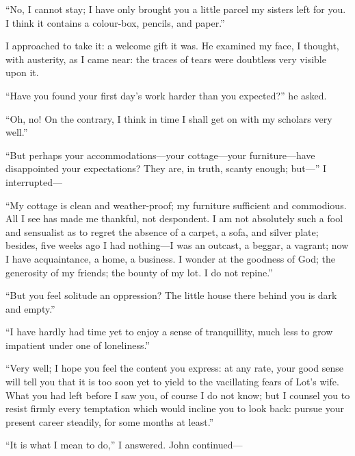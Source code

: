 \enquote{No, I cannot stay; I have only brought you a little parcel my
	sisters left for you. I think it contains a colour-box, pencils, and
	paper.}

I approached to take it: a welcome gift it was. He examined my face, I
thought, with austerity, as I came near: the traces of tears were
doubtless very visible upon it.

\enquote{Have you found your first day's work harder than you expected?}
he asked.

\enquote{Oh, no! On the contrary, I think in time I shall get on with
	my scholars very well.}

\enquote{But perhaps your accommodations---your cottage---your
	furniture---have disappointed your expectations? They are, in truth,
	scanty enough; but---} I interrupted---

\enquote{My cottage is clean and weather-proof; my furniture sufficient
	and commodious. All I see has made me thankful, not despondent. I am
	not absolutely such a fool and sensualist as to regret the absence of a
	carpet, a sofa, and silver plate; besides, five weeks ago I had
	nothing---I was an outcast, a beggar, a vagrant; now I have
	acquaintance, a home, a business. I wonder at the goodness of God; the
	generosity of my friends; the bounty of my lot. I do not repine.}

\enquote{But you feel solitude an oppression? The little house there
	behind you is dark and empty.}

\enquote{I have hardly had time yet to enjoy a sense of tranquillity,
	much less to grow impatient under one of loneliness.}

\enquote{Very well; I hope you feel the content you express: at any
	rate, your good sense will tell you that it is too soon yet to yield to
	the vacillating fears of Lot's wife. What you had left before I saw
	you, of course I do not know; but I counsel you to resist firmly every
	temptation which would incline you to look back: pursue your present
	career steadily, for some months at least.}

\enquote{It is what I mean to do,} I answered. \St{} John continued---

